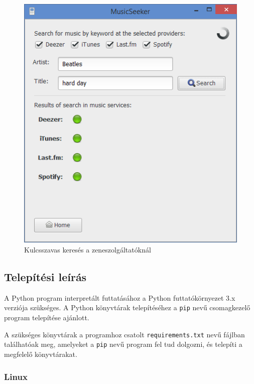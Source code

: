 \begin{figure}[htp]
\centering
\includegraphics[scale=0.4]{img/screenshots/screenshot05.png}
\caption{Kulcsszavas keresés a zeneszolgáltatóknál}
\label{fig:scrkword}
\end{figure}



\subsection{Telepítési leírás}
\label{sub:telepitesileiras}

A Python program interpretált futtatásához a Python futtatókörnyezet 3.x verziója szükséges. A Python könyvtárak telepítéséhez a \texttt{pip} nevű csomagkezelő program telepítése ajánlott.

A szükséges könyvtárak a programhoz csatolt \texttt{requirements.txt} nevű fájlban találhatóak meg, amelyeket a \texttt{pip} nevű program fel tud dolgozni, és telepíti a megfelelő könyvtárakat.

\subsubsection{Linux}
\label{ssub:linux}

